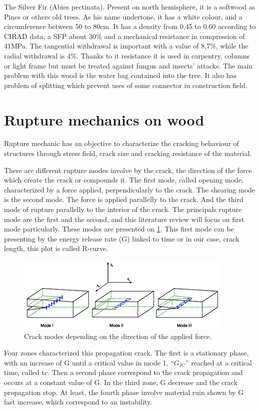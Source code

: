 The Silver Fir (Abies pectinata). Present on north hemisphere, it is a softwood as Pines or others old trees. As his name undertone, it has a white colour, and a circumference between 50 to 80cm. It has a density from 0,45 to 0.60 according to CIRAD data, a SFP about 30\% and a mechanical resistance in compression of 41MPa. The tangential withdrawal is important with a value of 8,7\%, while the radial withdrawal is 4\%. Thanks to it resistance it is used in carpentry, columns or light frame but must be treated against fungus and insects’ attacks. The main problem with this wood is the water bag contained into the tree. It also has problem of splitting which prevent uses of some connector in construction field.


\section{Rupture mechanics on wood}
Rupture mechanic has an objective to characterize the cracking behaviour of structures through stress field, crack size and cracking resistance of the material.

There are different rupture modes involve by the crack, the direction of the force which create the crack or compounds it. The first mode, called opening mode, characterized by a force applied, perpendicularly to the crack. The shearing mode is the second mode. The force is applied parallelly to the crack. And the third mode of rupture parallelly to the interior of the crack. The principals rupture mode are the first and the second, and this literature review will focus on first mode particularly. These modes are presented on \ref{fig:Fig3}. This first mode can be presenting by the energy release rate (G) linked to time or in our case, crack length, this plot is called R-curve.
\begin{figure}[th]
	\centering
	\includegraphics{Figures/Mode_presentation}
	\decoRule
	\caption[Crack modes]{Crack modes depending on the direction of the applied force.}
	\label{fig:Fig3}
\end{figure}
Four zones characterized this propagation crack. The first is a stationary phase, with an increase of G until a critical value in mode 1, “$G_{IC}$” reached at a critical time, called tc. Then a second phase correspond to the crack propagation and occurs at a constant value of G. In the third zone, G decrease and the crack propagation stop. At least, the fourth phase involve material ruin shown by G fast increase, which correspond to an instability.

